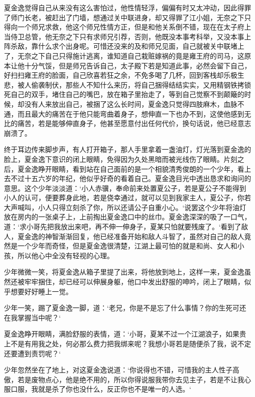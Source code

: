 夏金逸觉得自己从来没有这么害怕过，他性情轻浮，偏偏有时又太冲动，因此得罪了师门长老，被赶出了门墙，想通过关中联进身，却又得罪了江小姐，无奈之下只得向一个师兄求救，他这个师兄性情方正，但是和他关系倒不错，现在在太子府上当侍卫总管，他无奈之下只有求师兄引荐，否则，他既没本事考科举，又没本事上阵杀敌，靠什么求个出身呢。可惜还没来的及和师兄见面，自己就被关中联堵上了，无奈之下自己只得施计逃离，谁知道自己栽赃嫁祸的竟是雍王府的司马，这原本让他十分气馁，但是师兄告诉自己，太子殿下若是知道此事，必然会留下自己，好扫扫雍王府的脸面，自己欣喜若狂之余，不免多喝了几杯，回到客栈却乐极生悲，被人偷袭制伏，那些人不知什么来历，将自己捆得结结实实，又用精钢铁拷锁死自己的双手，堵住自己的嘴巴，放在箱子里抬走了，等到自己觉察不到颠簸的时候，却没有人来放出自己，被捆了这么长时间，夏金逸只觉得四肢麻木，血脉不通，而且最大的痛苦在于他只能弯曲着身子，想伸直一下也办不到，这使他感到无比的痛苦，若是能够伸直身子，他甚至愿意付出任何代价，换句话说，他已经意志崩溃了。

终于耳边传来脚步声，有人打开箱子，那人手里拿着一盏油灯，灯光落到夏金逸的脸上，夏金逸下意识的闭上眼睛，免得因为久处黑暗而被光线伤了眼睛。片刻之后，夏金逸睁开眼睛，看到站在自己面前的是一个相貌清秀俊朗的一个少年，看上去不过十五六岁的年纪，他似乎好奇的看着自己。夏金逸目光中透出恳求和询问的意思。这个少年淡淡道：‘小人赤骥，奉命前来处置夏公子，若是夏公子不能得到小人的认可，便要葬身此地，若是侥幸通过，就可以见到我家主人，夏公子，你若大声喊叫，小人只得立刻杀了你，所以还请公子自重小心。‘说罢这个少年将油灯放在房内的一张桌子上，上前掏出夏金逸口中的丝巾。夏金逸深深的吸了一口气，道：‘求小哥先把我放出来吧，再不伸一伸身子，夏某只怕就要残废了。‘看到了敌人，夏金逸的神智渐渐回复，他已经准备开始和敌人斗智了，虽然对自己的敌人竟然是一个少年而奇怪，但是夏金逸很清楚，江湖上最可怕的就是和尚、女人和小孩，所以他心中全没有轻视的心理。

少年微微一笑，将夏金逸从箱子里提了出来，将他放到地上，这样一来，夏金逸虽然还被牢牢捆住，却已经可以伸展身躯，他口中发出舒服的呻吟，闭上了眼睛，似乎想要好好睡上一觉。

少年一笑，踢了夏金逸一脚，道：‘老兄，你是不是忘了什么事情？你的生死可还在我掌握当中呢？‘

夏金逸睁开眼睛，满脸舒服的表情，道：‘小哥，夏某不过一个江湖浪子，如果贵上不是有用我之处，何必那么费力把我绑来呢？我想小哥若是随便杀了我，说不定还要遭到责罚呢？‘

少年忽然坐在了地上，对这夏金逸说道：‘你说得也不错，可惜我的主人性子高傲，若是废物点心，他是绝不用的，所以你得说服我带你去见主子，若是不让我心服口服，我就是杀了你也没什么，反正你也不是唯一的人选。‘

